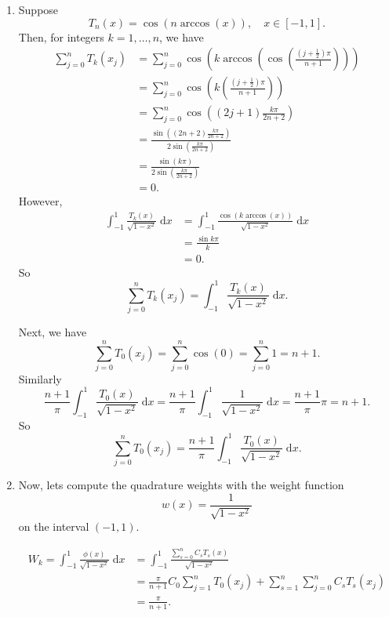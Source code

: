 \documentclass[a4paper,12pt]{article}
\newcommand{\dd}[1]{\mathrm{d}#1}
\begin{document}
\begin{enumerate}[label = \arabic*.]
\begin{enumerate}[label = (\roman*)]
				\item Suppose
				\[
					T_n(x) = \cos(n \arccos(x)), \quad x \in [-1, 1].
				\]
				Then, for integers $ k = 1, \ldots, n $, we have
				\begin{align*}
					\sum_{j = 0}^{n} T_k(x_j) &= \sum_{j = 0}^{n} \cos\left(k \arccos\left(\cos\left(\frac{\left(j + \frac{1}{2}\right)\pi}{n + 1}\right)\right)\right) \\
					&= \sum_{j = 0}^{n} \cos\left(k \left(\frac{\left(j + \frac{1}{2}\right)\pi}{n + 1}\right)\right) \\
					&= \sum_{j = 0}^{n} \cos\left((2j + 1)\frac{k \pi}{2n + 2}\right) \\
					&= \frac{\sin\left((2n + 2)\frac{k \pi}{2n + 2}\right)}{2 \sin\left(\frac{k \pi}{2n + 2}\right)} \\
					&=\frac{\sin(k \pi)}{2 \sin\left(\frac{k \pi}{2n + 2}\right)} \\
					&= 0.
				\end{align*}
				However,
				\begin{align*}
					\int_{-1}^{1} \frac{T_k(x)}{\sqrt{1 - x^2}} \;\dd x &= \int_{-1}^{1} \frac{\cos(k \arccos(x))}{\sqrt{1 - x^2}} \;\dd x \\
					&= \frac{\sin{k \pi}}{k} \\
					&= 0.
				\end{align*}
				So
				\[
					\boxed{\sum_{j = 0}^{n} T_k(x_j) = \int_{-1}^{1} \frac{T_k(x)}{\sqrt{1 - x^2}} \;\dd x.}
				\]
				
				Next, we have
				\[
					\sum_{j = 0}^{n} T_0(x_j) = \sum_{j = 0}^{n} \cos(0) = \sum_{j = 0}^{n} 1 = n + 1.
				\]
				Similarly
				\[
					\frac{n + 1}{\pi} \int_{-1}^{1} \frac{T_0(x)}{\sqrt{1 - x^2}} \;\dd x = \frac{n + 1}{\pi} \int_{-1}^{1} \frac{1}{\sqrt{1 - x^2}} \;\dd x = \frac{n + 1}{\pi} \pi = n + 1.
				\]
				So
				\[
					\boxed{\sum_{j = 0}^{n} T_0(x_j) = \frac{n + 1}{\pi} \int_{-1}^{1} \frac{T_0(x)}{\sqrt{1 - x^2}} \;\dd x.}
				\]
				
				\item Now, lets compute the quadrature weights with the weight function
				\[
					w(x) = \frac{1}{\sqrt{1 - x^2}}
				\]
				on the interval $ (-1, 1) $.
				
				\begin{align*}
					W_k = \int_{-1}^{1} \frac{\phi(x)}{\sqrt{1 - x^2}} \;\dd x &= \int_{-1}^{1} \frac{\sum_{s = 0}^{n} C_s T_s (x)}{\sqrt{1 - x^2}} \\
					&= \frac{\pi}{n + 1} C_0 \sum_{j = 1}^{n} T_0 (x_j) + \sum_{s = 1}^{n} \sum_{j = 0}^{n} C_sT_s(x_j) \\
					&= \frac{\pi}{n + 1}.
				\end{align*}
			\end{enumerate}
		

\end{enumerate}
\end{document}
